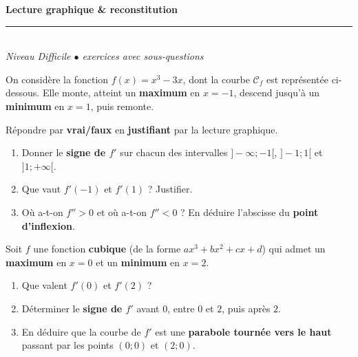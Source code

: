 \documentclass[11pt,a4paper]{article}
\begin{document}
\begin{center}
{\LARGE\bfseries\color{primarydark} Lecture graphique \& reconstitution}\\[2pt]
{\color{primary}\rule{0.5\textwidth}{1.2pt}}\\[4pt]
{\small\itshape Niveau Difficile \quad$\bullet$ exercices avec sous-questions}
\end{center}
\vspace{2mm}

\begin{exo}
On considère la fonction $f(x)=x^3-3x$, dont la courbe $\mathcal{C}_f$ est représentée ci-dessous. Elle monte, atteint un \textbf{maximum} en $x=-1$, descend jusqu'à un \textbf{minimum} en $x=1$, puis remonte.
\begin{center}
\end{center}
Répondre par \textbf{vrai/faux} en \textbf{justifiant} par la lecture graphique.
\begin{enumerate}[label=\alph*),leftmargin=7mm,itemsep=2pt]
\item Donner le \textbf{signe de $f'$} sur chacun des intervalles $]-\infty;-1[$, $]-1;1[$ et $]1;+\infty[$.
\item Que vaut $f'(-1)$ et $f'(1)$ ? Justifier.
\item Où a-t-on $f''>0$ et où a-t-on $f''<0$ ? En déduire l'abscisse du \textbf{point d'inflexion}.
\end{enumerate}
\end{exo}

\begin{exo}
Soit $f$ une fonction \textbf{cubique} (de la forme $ax^3+bx^2+cx+d$) qui admet un \textbf{maximum} en $x=0$ et un \textbf{minimum} en $x=2$.
\begin{enumerate}[label=\alph*),leftmargin=7mm,itemsep=2pt]
\item Que valent $f'(0)$ et $f'(2)$ ?
\item Déterminer le \textbf{signe de $f'$} avant $0$, entre $0$ et $2$, puis après $2$.
\item En déduire que la courbe de $f'$ est une \textbf{parabole tournée vers le haut} passant par les points $(0;0)$ et $(2;0)$.
\end{enumerate}
\end{exo}
\end{document}
